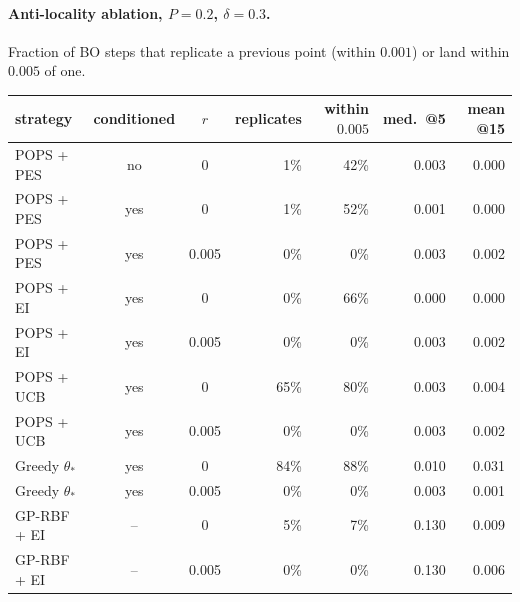 \paragraph{Anti-locality ablation, $P=0.2$, $\delta=0.3$.} Fraction of BO steps that replicate a previous point (within $0.001$) or land within $0.005$ of one.

\begin{center}\small\begin{tabular}{lccrrrr}\toprule
strategy & conditioned & $r$ & replicates & within $0.005$ & med.\ @5 & mean @15\\\midrule
POPS + PES & no & 0 & 1\% & 42\% & 0.003 & 0.000\\
POPS + PES & yes & 0 & 1\% & 52\% & 0.001 & 0.000\\
POPS + PES & yes & 0.005 & 0\% & 0\% & 0.003 & 0.002\\
POPS + EI & yes & 0 & 0\% & 66\% & 0.000 & 0.000\\
POPS + EI & yes & 0.005 & 0\% & 0\% & 0.003 & 0.002\\
POPS + UCB & yes & 0 & 65\% & 80\% & 0.003 & 0.004\\
POPS + UCB & yes & 0.005 & 0\% & 0\% & 0.003 & 0.002\\
Greedy $\theta_*$ & yes & 0 & 84\% & 88\% & 0.010 & 0.031\\
Greedy $\theta_*$ & yes & 0.005 & 0\% & 0\% & 0.003 & 0.001\\
GP-RBF + EI & -- & 0 & 5\% & 7\% & 0.130 & 0.009\\
GP-RBF + EI & -- & 0.005 & 0\% & 0\% & 0.130 & 0.006\\
\bottomrule\end{tabular}\end{center}

